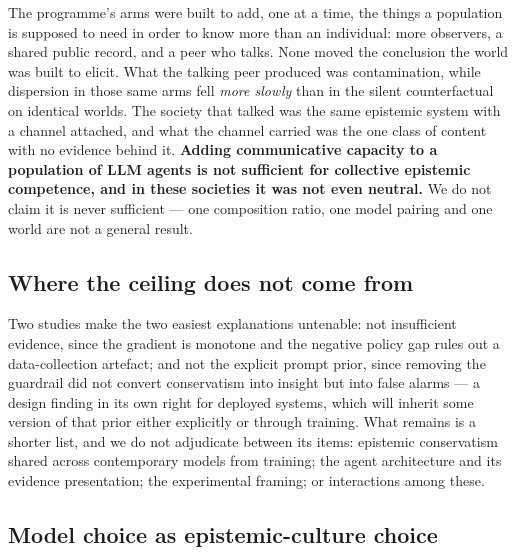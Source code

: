 \documentclass[pdflatex,sn-basic]{sn-jnl}
\begin{document}
The programme's
arms were built to add, one at a time, the things a population is supposed to need in order to
know more than an individual: more observers, a shared public record, and a peer who talks. None
moved the conclusion the world was built to elicit. What the talking peer produced was
contamination, while dispersion in those same arms fell \emph{more slowly} than in the silent
counterfactual on identical worlds. The society that talked was the same epistemic system with a
channel attached, and what the channel carried was the one class of content with no evidence
behind it. \textbf{Adding communicative capacity to a population of LLM agents is not sufficient for
collective epistemic competence, and in these societies it was not even neutral.} We do not
claim it is never sufficient --- one composition ratio, one model pairing and one world are not a
general result.

\hypertarget{where-the-ceiling-does-not-come-from}{%
\subsection{Where the ceiling does not come from}\label{where-the-ceiling-does-not-come-from}}

Two studies make the two easiest explanations
untenable: not insufficient evidence, since the gradient is monotone and the negative
policy gap rules out a data-collection artefact; and not the explicit prompt prior, since
removing the guardrail did not convert conservatism into insight but into false alarms --- a
design finding in its own right for deployed systems, which will inherit some version of
that prior either explicitly or through training. What remains is a shorter list, and we
do not adjudicate between its items: epistemic conservatism shared across contemporary
models from training; the agent architecture and its evidence presentation; the
experimental framing; or interactions among these.

\hypertarget{model-choice-as-epistemic-culture-choice}{%
\subsection{Model choice as epistemic-culture choice}\label{model-choice-as-epistemic-culture-choice}}
\end{document}
